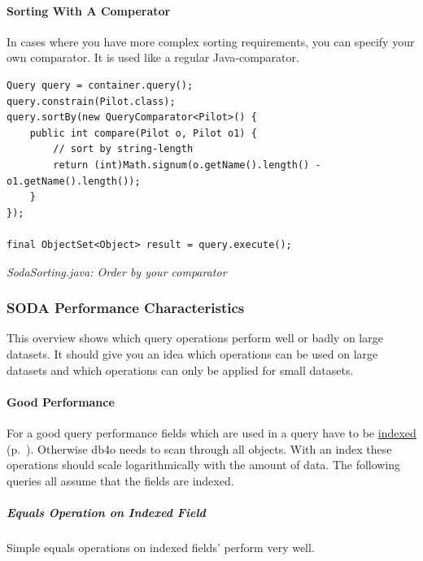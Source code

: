 \paragraph{Sorting With A Comperator}
\label{ref:basics-querying-soda-soda-sorting:costumsorting}

In cases where you have more complex sorting requirements, you can specify your own comparator. It is used like a regular Java-comparator.

\begin{lstlisting}
Query query = container.query();
query.constrain(Pilot.class);
query.sortBy(new QueryComparator<Pilot>() {
    public int compare(Pilot o, Pilot o1) {
        // sort by string-length
        return (int)Math.signum(o.getName().length() - o1.getName().length());
    }
});

final ObjectSet<Object> result = query.execute();
\end{lstlisting}

{\small\itshape SodaSorting.java: Order by your comparator\par}
\medskip

\subsubsection{SODA Performance Characteristics}
\label{ref:basics-querying-soda-soda-performance-characteristics}

This overview shows which query operations perform well or badly on large datasets. It should give you an idea which operations can be used on large datasets and which operations can only be applied for small datasets.

\paragraph{Good Performance}
\label{ref:basics-querying-soda-soda-performance-characteristics:goodperf}

For a good query performance fields which are used in a query have to be \hyperref[ref:basics-indexing]{indexed} (p.~\pageref{ref:basics-indexing}). Otherwise db4o needs to scan through all objects. With an index these operations should scale logarithmically with the amount of data. The following queries all assume that the fields are indexed.

\subparagraph*{Equals Operation on Indexed Field}

Simple equals operations on indexed fields' perform very well.

